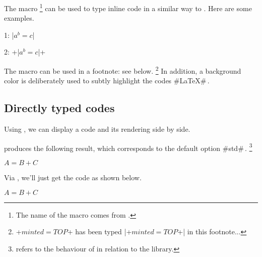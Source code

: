 The  macro
\footnote{
    The name of the macro  comes from .
}
can be used to type inline code in a similar way to .
Here are some examples.


\begin{tdoclatex}[sbs]
    1: \tdocinlatex|$a^b = c$|

    2: \tdocinlatex+\tdocinlatex|$a^b = c$|+
\end{tdoclatex}


\begin{tdocnote}
    The  macro can be used in a footnote: see below.
    \footnote{
        \tdocinlatex+$minted = TOP$+ has been typed \tdocinlatex|\tdocinlatex+$minted = TOP$+| in this footnote...
    }
    In addition, a background color is deliberately used to subtly highlight the codes \tdocinlatex#\LaTeX#\,.
\end{tdocnote}




\subsection{Directly typed codes}

\begin{tdocexa}
    Using , we can display a code and its rendering side by side.

\end{tdocexa}




\begin{tdocexa}[Following]
     produces the following result, which corresponds to the default option \tdocinlatex#std#\,.
    \footnote{
         refers to the  behaviour of  in relation to the  library.
    }

    \begin{tdoclatex}
        $A = B + C$
    \end{tdoclatex}
\end{tdocexa}




\begin{tdocexa}
    Via , we'll just get the code as shown below.

    \begin{tdoclatex}[code]
        $A = B + C$
    \end{tdoclatex}
\end{tdocexa}


